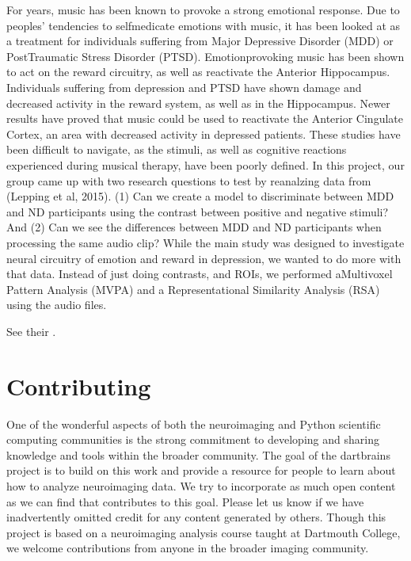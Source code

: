 \documentclass[letterpaper,10pt,english]{sphinxmanual}
\begin{document}
For years, music has been known to provoke a strong emotional response. Due to peoples’ tendencies to self\sphinxhyphen{}medicate emotions with music, it has been looked at as a treatment for individuals suffering from Major Depressive Disorder (MDD) or Post\sphinxhyphen{}Traumatic Stress Disorder (PTSD). Emotion\sphinxhyphen{}provoking music has been shown to act on the reward circuitry, as well as reactivate the Anterior Hippocampus. Individuals suffering from depression and PTSD have shown damage and decreased activity in the reward system, as well as in the Hippocampus. Newer results have proved that music could be used to reactivate the Anterior Cingulate Cortex, an area with decreased activity in depressed patients. These studies have been difficult to navigate, as the stimuli, as well as cognitive reactions experienced during musical therapy, have been poorly defined. In this project, our group came up with two research questions to test by reanalzing data from (Lepping et al, 2015). (1) Can we create a model to discriminate between MDD and ND participants using the contrast between positive and negative stimuli? And (2) Can we see the differences between MDD and ND participants when processing the same audio clip? While the main study was designed to investigate neural circuitry of emotion and reward in depression, we wanted to do more with that data. Instead of just doing contrasts, and ROIs, we performed a ​Multivoxel Pattern Analysis (MVPA) and a ​Representational Similarity Analysis​ (RSA) using the audio files.

See their .


\section{Contributing}
\label{\detokenize{content/Contributing:contributing}}\label{\detokenize{content/Contributing::doc}}
One of the wonderful aspects of both the neuroimaging and Python scientific computing communities is the strong commitment to developing and sharing knowledge and tools within the broader community. The goal of the dartbrains project is to build on this work and provide a resource for people to learn about how to analyze neuroimaging data. We try to incorporate as much open content as we can find that contributes to this goal. Please let us know if we have inadvertently omitted credit for any content generated by others. Though this project is based on a neuroimaging analysis course taught at Dartmouth College, we welcome contributions from anyone in the broader imaging community.
\end{document}
